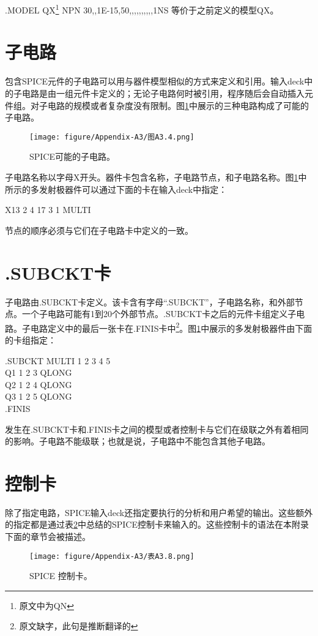 .MODEL QX\footnote{原文中为QN} NPN 30,,1E-15,50,,,,,,,,,,1NS
等价于之前定义的模型QX。

\section{子电路}
包含SPICE元件的子电路可以用与器件模型相似的方式来定义和引用。输入deck中的子电路是由一组元件卡定义的；无论子电路何时被引用，程序随后会自动插入元件组。对子电路的规模或者复杂度没有限制。图\ref{图A3.4}中展示的三种电路构成了可能的子电路。

\begin{figure}[htbp]
\small
    \centering
    \texttt{[image: figure/Appendix-A3/图A3.4.png]}
    \caption{SPICE可能的子电路。}
    \label{图A3.4}
\end{figure}

子电路名称以字母X开头。器件卡包含名称，子电路节点，和子电路名称。图\ref{图A3.4}中所示的多发射极器件可以通过下面的卡在输入deck中指定：

X13 2 4 17 3 1 MULTI

节点的顺序必须与它们在子电路卡中定义的一致。

\section{.SUBCKT卡}
子电路由.SUBCKT卡定义。该卡含有字母“.SUBCKT”，子电路名称，和外部节点。一个子电路可能有1到20个外部节点。.SUBCKT卡之后的元件卡组定义子电路。子电路定义中的最后一张卡在.FINIS卡中\footnote{原文缺字，此句是推断翻译的}。图\ref{图A3.4}中展示的多发射极器件由下面的卡组指定：

.SUBCKT MULTI 1 2 3 4 5\\
Q1 1 2 3 QLONG\\
Q2 1 2 4 QLONG\\
Q3 1 2 5 QLONG\\
.FINIS

发生在.SUBCKT卡和.FINIS卡之间的模型或者控制卡与它们在级联之外有着相同的影响。子电路不能级联；也就是说，子电路中不能包含其他子电路。

\section{控制卡}
除了指定电路，SPICE输入deck还指定要执行的分析和用户希望的输出。这些额外的指定都是通过表\ref{表A3.8}中总结的SPICE控制卡来输入的。这些控制卡的语法在本附录下面的章节会被描述。

\begin{figure}[htbp]
\small
    \centering
    \texttt{[image: figure/Appendix-A3/表A3.8.png]}
    \caption{SPICE 控制卡。}
    \label{表A3.8}
\end{figure}

